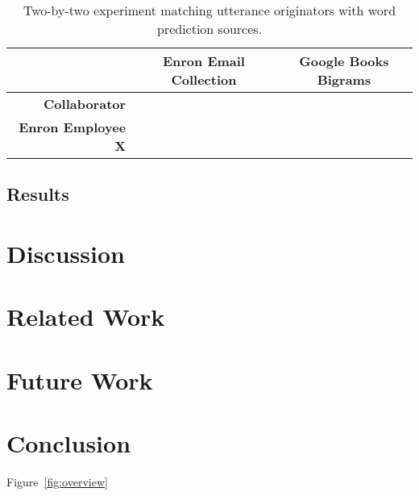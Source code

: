 \documentclass{sigchi}
\begin{document}
\begin{table}
    \begin{tabular}{|r|c|c|}
        \hline
        ~                & {\bf Enron Email Collection} & {\bf Google Books Bigrams} \\ \hline
        {\bf Collaborator}     & ~                      & ~                    \\ 
        {\bf Enron Employee X} & ~                      & ~                    \\
        \hline
    \end{tabular}
    \caption{Two-by-two experiment matching utterance originators with
      word prediction sources.}
    \label{tab:conditions}
\end{table}

\subsection{Results}
\section{Discussion}
\section{Related Work}
\section{Future Work}
\section{Conclusion}

Figure~\ref{fig:overview} 

%
%
%
%
%
\balance



\end{document}
